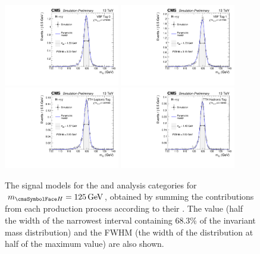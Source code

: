 \begin{figure}[ht!]
\centering
\includegraphics[width=0.45\textwidth]{modellingFigures/DCBpG/VBFTag_0.pdf} 
\includegraphics[width=0.45\textwidth]{modellingFigures/DCBpG/VBFTag_1.pdf} \\
\includegraphics[width=0.45\textwidth]{modellingFigures/DCBpG/TTHLeptonicTag.pdf} 
\includegraphics[width=0.45\textwidth]{modellingFigures/DCBpG/TTHHadronicTag.pdf} 

\caption{The signal models for the \VBFTag and \TTHTag analysis categories for $\mH=125\GeV$, obtained by summing the contributions from each production process according to their \effxacc. The \effSigma value (half the width of the narrowest interval containing 68.3\% of the invariant mass distribution) and the FWHM (the width of the distribution at half of the maximum value) are also shown.}

\label{fig:model:sig_model_per_category_exc}
\end{figure}



